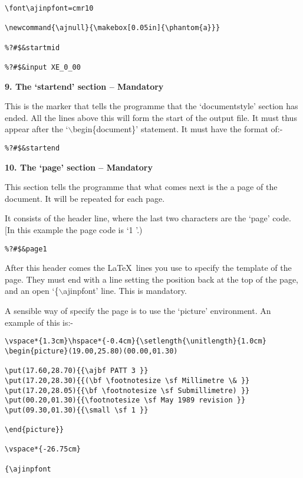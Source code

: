 \begin{verbatim}
\font\ajinpfont=cmr10

\newcommand{\ajnull}{\makebox[0.05in]{\phantom{a}}}

%?#$&startmid

%?#$&input XE_0_00
\end{verbatim}

\vspace*{0.2cm}
{\bf \large 9. The `startend' section -- Mandatory}

\vspace*{0.2cm}

This is the marker that tells the programme that the `documentstyle'
section has ended. All the lines above this will form the start of the
output file. It must thus appear after the `$\backslash$begin\{document\}'
statement. It must have the format of:-

\begin{verbatim}
%?#$&startend
\end{verbatim}

\vspace*{0.2cm}
{\bf \large 10. The `page' section -- Mandatory}
\vspace*{0.2cm}

This section tells the programme that what comes next is the a page of the
document. It will be repeated for each page.

It consists of the header line, where the last two characters are the
`page' code. [In this example the page code is `1 '.)

\begin{verbatim}
%?#$&page1
\end{verbatim}

After this header comes the \LaTeX\ lines you use to specify the template
of the page. They must end with a  line setting the position back at the
top of the page, and an open `\{$\backslash$ajinpfont' line. This is mandatory.

A sensible way of specify the page is to use the `picture' environment. An
example of this is:-

\begin{verbatim}
\vspace*{1.3cm}\hspace*{-0.4cm}{\setlength{\unitlength}{1.0cm}
\begin{picture}(19.00,25.80)(00.00,01.30)

\put(17.60,28.70){{\ajbf PATT 3 }}
\put(17.20,28.30){{(\bf \footnotesize \sf Millimetre \& }}
\put(17.20,28.05){{\bf \footnotesize \sf Submillimetre) }}
\put(00.20,01.30){{\footnotesize \sf May 1989 revision }}
\put(09.30,01.30){{\small \sf 1 }}

\end{picture}}

\vspace*{-26.75cm}

{\ajinpfont
\end{verbatim}

